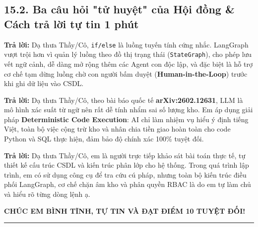 \documentclass[11pt,a4paper]{article}
\begin{document}
\subsection{15.2. Ba câu hỏi "tử huyệt" của Hội đồng \& Cách trả lời tự tin 1 phút}
\begin{notebox}
\textbf{Trả lời:} Dạ thưa Thầy/Cô, \texttt{if/else} là luồng tuyến tính cứng nhắc. LangGraph vượt trội hơn vì quản lý luồng theo đồ thị trạng thái (\texttt{StateGraph}), cho phép lưu vết ngữ cảnh, dễ dàng mở rộng thêm các Agent con độc lập, và đặc biệt là hỗ trợ cơ chế tạm dừng luồng chờ con người bấm duyệt (\textbf{Human-in-the-Loop}) trước khi ghi dữ liệu vào CSDL.
\end{notebox}

\begin{notebox}
\textbf{Trả lời:} Dạ thưa Thầy/Cô, theo bài báo quốc tế \textbf{arXiv:2602.12631}, LLM là mô hình xác suất từ ngữ nên rất dễ tính nhẩm sai số lượng kho. Em áp dụng giải pháp \textbf{Deterministic Code Execution}: AI chỉ làm nhiệm vụ hiểu ý định tiếng Việt, toàn bộ việc cộng trừ kho và nhân chia tiền giao hoàn toàn cho code Python và SQL thực hiện, đảm bảo độ chính xác 100\% tuyệt đối.
\end{notebox}

\begin{notebox}
\textbf{Trả lời:} Dạ thưa Thầy/Cô, em là người trực tiếp khảo sát bài toán thực tế, tự thiết kế cấu trúc CSDL và kiến trúc phân lớp cho hệ thống. Trong quá trình lập trình, em có sử dụng công cụ để tra cứu cú pháp, nhưng toàn bộ kiến trúc điều phối LangGraph, cơ chế chặn âm kho và phân quyền RBAC là do em tự làm chủ và hiểu rõ từng dòng lệnh ạ.
\end{notebox}

\vspace{0.4cm}
\begin{center}
    {\large \bfseries \color{blue!85!black} CHÚC EM BÌNH TĨNH, TỰ TIN VÀ ĐẠT ĐIỂM 10 TUYỆT ĐỐI!}\\[0.5em]
    \rule{0.6\textwidth}{0.6pt}
\end{center}
\end{document}
